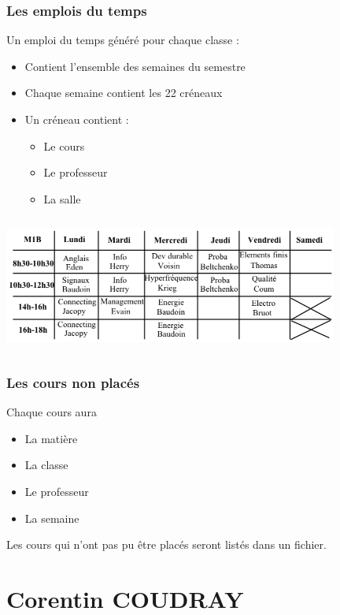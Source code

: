 \documentclass{beamer}
\begin{document}
\begin {frame}
\frametitle{Les emplois du temps}
Un emploi du temps généré pour chaque classe : \\
\begin{itemize}
\item Contient l'ensemble des semaines du semestre
\item Chaque semaine contient les 22 créneaux
\item Un créneau contient : 
\begin {itemize}
\item Le cours
\item Le professeur
\item La salle
\end{itemize}
\end{itemize}
\end{frame}

\begin{frame}
\begin{center}
\includegraphics [width=110mm, height=45mm]{Dessin2.png}
\end{center}
\end{frame}

\begin{frame}
\frametitle{Les cours non placés}
\begin{block}{Chaque cours aura}
\begin{itemize}
\item La matière
\item La classe
\item Le professeur
\item La semaine
\end{itemize}
\end{block}
\vspace{0.6cm}
Les cours qui n'ont pas pu être placés seront listés dans un fichier.
\end{frame}

\section{Corentin COUDRAY}
\end{document}
